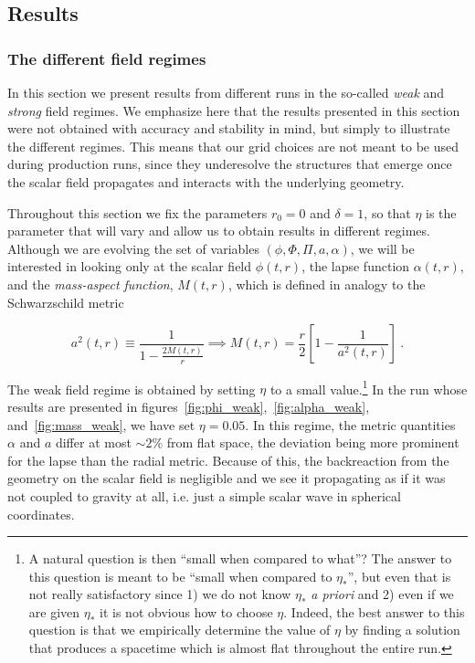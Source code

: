 \documentclass[a4paper,11pt]{article}
\renewcommand{\a}{\alpha}
\renewcommand{\d}{\delta}
\newcommand{\lrpar}[1]{\left( #1 \right)}
\newcommand{\lrsquare}[1]{\left[ #1 \right]}
\newcommand{\eq}[1]{
  \begin{equation}
    #1
  \end{equation}
}
\begin{document}
\subsection{Results}

\subsubsection{The different field regimes}

In this section we present results from different runs in the so-called \emph{weak} and \emph{strong} field regimes. We emphasize here that the results presented in this section were not obtained with accuracy and stability in mind, but simply to illustrate the different regimes. This means that our grid choices are not meant to be used during production runs, since they underesolve the structures that emerge once the scalar field propagates and interacts with the underlying geometry.

Throughout this section we fix the parameters $r_{0}=0$ and $\d=1$, so that $\eta$ is the parameter that will vary and allow us to obtain results in different regimes. Although we are evolving the set of variables $\lrpar{\phi,\Phi,\Pi,a,\a}$, we will be interested in looking only at the scalar field $\phi(t,r)$, the lapse function $\a(t,r)$, and the \emph{mass-aspect function}, $M(t,r)$, which is defined in analogy to the Schwarzschild metric

\eq{a^{2}(t,r) \equiv \frac{1}{1 - \frac{2M(t,r)}{r}} \implies M(t,r) = \frac{r}{2}\lrsquare{1 - \frac{1}{a^{2}(t,r)}}\ .}

The weak field regime is obtained by setting $\eta$ to a small value.\footnote{A natural question is then ``small when compared to what''? The answer to this question is meant to be ``small when compared to $\eta_{*}$'', but even that is not really satisfactory since 1) we do not know $\eta_{*}$ \emph{a priori} and 2) even if we are given $\eta_{*}$ it is not obvious how to choose $\eta$. Indeed, the best answer to this question is that we empirically determine the value of $\eta$ by finding a solution that produces a spacetime which is almost flat throughout the entire run.} In the run whose results are presented in figures~\ref{fig:phi_weak},~\ref{fig:alpha_weak}, and~\ref{fig:mass_weak}, we have set $\eta=0.05$. In this regime, the metric quantities $\a$ and $a$ differ at most $\sim2\%$ from flat space, the deviation being more prominent for the lapse than the radial metric. Because of this, the backreaction from the geometry on the scalar field is negligible and we see it propagating as if it was not coupled to gravity at all, i.e. just a simple scalar wave in spherical coordinates.
\end{document}
